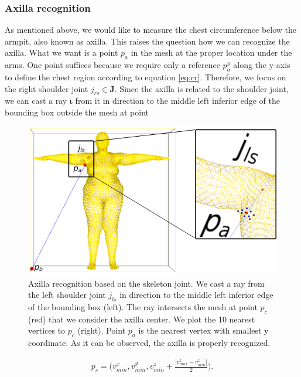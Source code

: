 \documentclass[runningheads, orivec]{llncs}
\begin{document}
\subsubsection{Axilla recognition}\label{subsec:armpit_recog}
As mentioned above, we would like to measure the chest circumference below the 
armpit, also known as axilla. This raises the question how we can recognize 
the axilla. What we want is a point $p_a$ in the mesh at the proper location 
under 
the arms. One point suffices because we require only a reference $p^y_a$ along 
the 
y-axis to define the chest region according to equation \ref{eq:cr}. Therefore, 
we focus on the right shoulder joint $j_{rs} \in \mathbf{J}$. Since the axilla 
is related to 
the shoulder joint, we can cast a ray $\boldsymbol{\iota}$ from it in direction 
to the middle left 
inferior edge of the bounding box outside the mesh at point

\begin{figure}[t]
	\begin{center}
		\includegraphics[width=\linewidth]{axilla_recognition_final.png}
	\end{center}
	\caption{Axilla recognition based on the skeleton joint. We cast a ray from 
		the left shoulder joint $j_{ls}$ in direction to the middle left 
		inferior edge of the bounding box (left). The ray intersects the mesh 
		at point $p_c$ (red) that we consider the axilla center. We plot the 10 
		nearest vertices to $p_c$ (right). Point $p_a$ is the nearest vertex 
		with smallest y coordinate. As it can be observed, the axilla is 
		properly recognized.}
	\label{fig:axilla-recognition}
\end{figure}

\begin{align}
p_c = \bigg(v^x_{min}, v^y_{min}, v^z_{min} + 
\frac{|v^z_{max} - v^z_{min}|}{2}\bigg).
\end{align}
\end{document}
